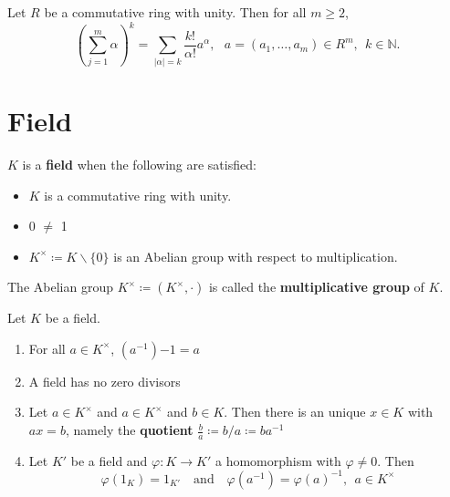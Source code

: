 \begin{definition}\label{def: multinomial_theorem}
    Let \(R\) be a commutative ring with unity. Then for all \(m \geq 2\),
    \[
      (\sum_{j=1}^m \alpha)^k = \sum_{ \left | \alpha \right | = k } \frac{k!}{\alpha!} a^{\alpha},
      \:\:\: a = (a_1, \ldots, a_m) \in R^m, \:\: k \in \mathbb{N}.  
    \]
\end{definition}

\section{Field}

\begin{definition}[Field]\label{def: field}
    \(K\) is a \textbf{field} when the following are satisfied:
    \begin{itemize}
        \item \(K\) is a commutative ring with unity.
        \item 0 \(\neq\) 1
        \item \(K^{\times} \coloneqq K \backslash \{0\} \) is an Abelian group with respect to multiplication.
    \end{itemize}
\end{definition}

\begin{note}
    The Abelian group \(K^{\times} \coloneqq \left(K^{\times}, \cdot\right)\) is called the 
    \textbf{multiplicative group} of \(K\).
\end{note}

\begin{remark}
    Let \(K\) be a field.

    \begin{enumerate}[label=(\alph*)]
        \item For all \(a \in K^{\times}\), \(\left(a^{-1}\right){-1} = a\)
        \item A field has no zero divisors
        \item Let \(a \in K^{\times}\) and \(a \in K^{\times}\) and \(b \in K\). Then there 
        is an unique \(x \in K\) with \(ax = b\), namely the \textbf{quotient} 
        \(\frac{b}{a} \coloneqq b/a \coloneqq ba^{-1}\)
        \item Let \(K{}'\) be a field and \(\varphi \colon K \rightarrow K{}'\) a 
        homomorphism with \(\varphi \neq 0\). Then 
        \[
            \varphi(1_K) = 1_{K{}'} \:\:\: \text{   and   } \:\:\: \varphi(a^{-1}) = \varphi(a)^{-1}, \:\: a \in K^\times  
        \]
    \end{enumerate}
\end{remark}

